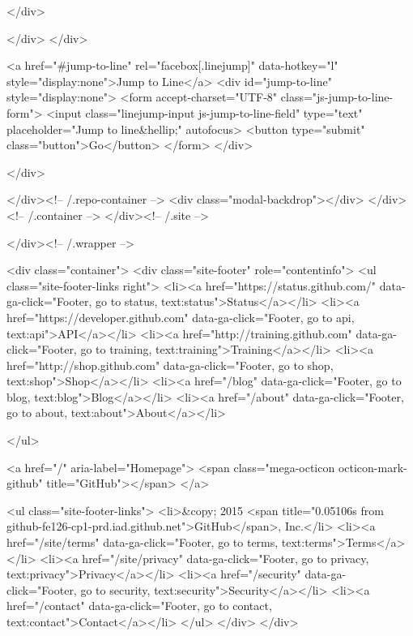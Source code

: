   </div>

  </div>
</div>

<a href="#jump-to-line" rel="facebox[.linejump]" data-hotkey="l" style="display:none">Jump to Line</a>
<div id="jump-to-line" style="display:none">
  <form accept-charset="UTF-8" class="js-jump-to-line-form">
    <input class="linejump-input js-jump-to-line-field" type="text" placeholder="Jump to line&hellip;" autofocus>
    <button type="submit" class="button">Go</button>
  </form>
</div>

        </div>

      </div><!-- /.repo-container -->
      <div class="modal-backdrop"></div>
    </div><!-- /.container -->
  </div><!-- /.site -->


    </div><!-- /.wrapper -->

      <div class="container">
  <div class="site-footer" role="contentinfo">
    <ul class="site-footer-links right">
        <li><a href="https://status.github.com/" data-ga-click="Footer, go to status, text:status">Status</a></li>
      <li><a href="https://developer.github.com" data-ga-click="Footer, go to api, text:api">API</a></li>
      <li><a href="http://training.github.com" data-ga-click="Footer, go to training, text:training">Training</a></li>
      <li><a href="http://shop.github.com" data-ga-click="Footer, go to shop, text:shop">Shop</a></li>
        <li><a href="/blog" data-ga-click="Footer, go to blog, text:blog">Blog</a></li>
        <li><a href="/about" data-ga-click="Footer, go to about, text:about">About</a></li>

    </ul>

    <a href="/" aria-label="Homepage">
      <span class="mega-octicon octicon-mark-github" title="GitHub"></span>
    </a>

    <ul class="site-footer-links">
      <li>&copy; 2015 <span title="0.05106s from github-fe126-cp1-prd.iad.github.net">GitHub</span>, Inc.</li>
        <li><a href="/site/terms" data-ga-click="Footer, go to terms, text:terms">Terms</a></li>
        <li><a href="/site/privacy" data-ga-click="Footer, go to privacy, text:privacy">Privacy</a></li>
        <li><a href="/security" data-ga-click="Footer, go to security, text:security">Security</a></li>
        <li><a href="/contact" data-ga-click="Footer, go to contact, text:contact">Contact</a></li>
    </ul>
  </div>
</div>



